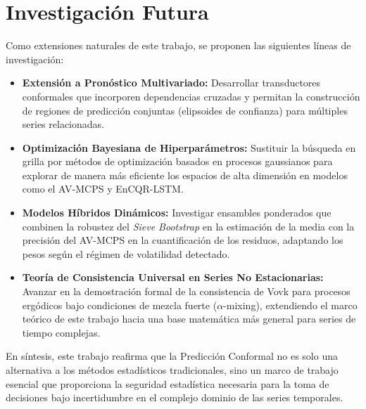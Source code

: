 \section{Investigación Futura}

Como extensiones naturales de este trabajo, se proponen las siguientes líneas de investigación:

\begin{itemize}
    \item \textbf{Extensión a Pronóstico Multivariado:} Desarrollar transductores conformales que incorporen dependencias cruzadas y permitan la construcción de regiones de predicción conjuntas (elipsoides de confianza) para múltiples series relacionadas.
    
    \item \textbf{Optimización Bayesiana de Hiperparámetros:} Sustituir la búsqueda en grilla por métodos de optimización basados en procesos gaussianos para explorar de manera más eficiente los espacios de alta dimensión en modelos como el AV-MCPS y EnCQR-LSTM.
    
    \item \textbf{Modelos Híbridos Dinámicos:} Investigar ensambles ponderados que combinen la robustez del \textit{Sieve Bootstrap} en la estimación de la media con la precisión del AV-MCPS en la cuantificación de los residuos, adaptando los pesos según el régimen de volatilidad detectado.
    
    \item \textbf{Teoría de Consistencia Universal en Series No Estacionarias:} Avanzar en la demostración formal de la consistencia de Vovk para procesos ergódicos bajo condiciones de mezcla fuerte ($\alpha$-mixing), extendiendo el marco teórico de este trabajo hacia una base matemática más general para series de tiempo complejas.
\end{itemize}

En síntesis, este trabajo reafirma que la Predicción Conformal no es solo una alternativa a los métodos estadísticos tradicionales, sino un marco de trabajo esencial que proporciona la seguridad estadística necesaria para la toma de decisiones bajo incertidumbre en el complejo dominio de las series temporales.